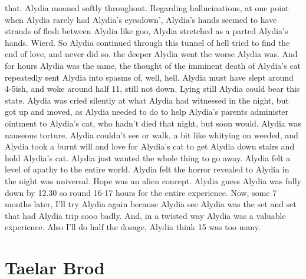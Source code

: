 \documentclass[12pt]{book}
\begin{document}
that. Alydia moaned softly throughout. Regarding hallucinations, at one point when Alydia rarely had Alydia's eyesdown', Alydia's hands seemed to have strands of flesh between Alydia like goo, Alydia stretched as a parted Alydia's hands. Wierd. So Alydia continued through this tunnel of hell tried to find the end of love, and never did so. the deeper Alydia went the worse Alydia was. And for hours Alydia was the same, the thought of the imminent death of Alydia's cat repeatedly sent Alydia into spasms of, well, hell. Alydia must have slept around 4-5ish, and woke around half 11, still not down. Lying still Alydia could bear this state. Alydia was cried silently at what Alydia had witnessed in the night, but got up and moved, as Alydia needed to do to help Alydia's parents administer ointment to Alydia's cat, who hadn't died that night, but soon would. Alydia was nauseous torture. Alydia couldn't see or walk, a bit like whitying on weeded, and Alydia took a burnt will and love for Alydia's cat to get Alydia down stairs and hold Alydia's cat. Alydia just wanted the whole thing to go away. Alydia felt a level of apathy to the entire world. Alydia felt the horror revealed to Alydia in the night was universal. Hope was an alien concept. Alydia guess Alydia was fully down by 12.30 so round 16-17 hours for the entire experience. Now, some 7 months later, I'll try Alydia again because Alydia see Alydia was the set and set that had Alydia trip sooo badly. And, in a twisted way Alydia was a valuable experience. Also I'll do half the dosage, Alydia think 15 was too many.



\chapter{Taelar Brod}
\end{document}
